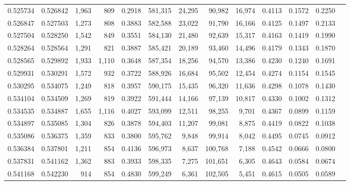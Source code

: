 \begin{tabular}{rrrrrrrrrrrrr}
0.525734 & 0.526842 &  1,963 &   809 &                                     0.2918 & 581,315 &  24,295 &  90,982 &  16,974 & 0.4113 & 0.1572 & 0.2250 \\
0.526847 & 0.527503 &  1,273 &   808 &                                     0.3883 & 582,588 &  23,022 &  91,790 &  16,166 & 0.4125 & 0.1497 & 0.2133 \\
0.527504 & 0.528250 &  1,542 &   849 &                                     0.3551 & 584,130 &  21,480 &  92,639 &  15,317 & 0.4163 & 0.1419 & 0.1990 \\
0.528264 & 0.528564 &  1,291 &   821 &                                     0.3887 & 585,421 &  20,189 &  93,460 &  14,496 & 0.4179 & 0.1343 & 0.1870 \\
0.528565 & 0.529892 &  1,933 & 1,110 &                                     0.3648 & 587,354 &  18,256 &  94,570 &  13,386 & 0.4230 & 0.1240 & 0.1691 \\
0.529931 & 0.530291 &  1,572 &   932 &                                     0.3722 & 588,926 &  16,684 &  95,502 &  12,454 & 0.4274 & 0.1154 & 0.1545 \\
0.530295 & 0.534075 &  1,249 &   818 &                                     0.3957 & 590,175 &  15,435 &  96,320 &  11,636 & 0.4298 & 0.1078 & 0.1430 \\
0.534104 & 0.534509 &  1,269 &   819 &                                     0.3922 & 591,444 &  14,166 &  97,139 &  10,817 & 0.4330 & 0.1002 & 0.1312 \\
0.534535 & 0.534887 &  1,655 & 1,116 &                                     0.4027 & 593,099 &  12,511 &  98,255 &   9,701 & 0.4367 & 0.0899 & 0.1159 \\
0.534897 & 0.535085 &  1,304 &   826 &                                     0.3878 & 594,403 &  11,207 &  99,081 &   8,875 & 0.4419 & 0.0822 & 0.1038 \\
0.535086 & 0.536375 &  1,359 &   833 &                                     0.3800 & 595,762 &   9,848 &  99,914 &   8,042 & 0.4495 & 0.0745 & 0.0912 \\
0.536384 & 0.537801 &  1,211 &   854 &                                     0.4136 & 596,973 &   8,637 & 100,768 &   7,188 & 0.4542 & 0.0666 & 0.0800 \\
0.537831 & 0.541162 &  1,362 &   883 &                                     0.3933 & 598,335 &   7,275 & 101,651 &   6,305 & 0.4643 & 0.0584 & 0.0674 \\
0.541168 & 0.542230 &    914 &   854 &                                     0.4830 & 599,249 &   6,361 & 102,505 &   5,451 & 0.4615 & 0.0505 & 0.0589 \\

\end{tabular}

